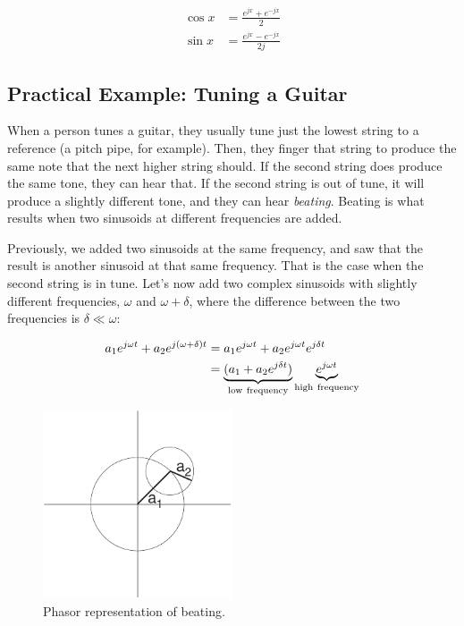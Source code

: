 \begin{align}
\cos x &= \frac{e^{jx}+e^{-jx}}{2}\\ 
\sin x &= \frac{e^{jx}-e^{-jx}}{2j}
\end{align}


\subsection*{Practical Example: Tuning a Guitar}

When a person tunes a guitar, they usually tune just the lowest string
to a reference (a pitch pipe, for example). Then, they finger that
string to produce the same note that the next higher string should.
If the second string does produce the same tone, they can hear that.
If the second string is out of tune, it will produce a slightly
different tone, and they can hear \emph{beating}. Beating is what
results when two sinusoids at different frequencies are added.

Previously, we added two sinusoids at the same frequency, and saw that
the result is another sinusoid at that same frequency.  That is the
case when the second string is in tune. Let's now add two complex
sinusoids with slightly different frequencies, $\omega$ and $\omega +
\delta$, where the difference between the two frequencies is
$\delta\ll\omega$:

\begin{align}
a_1 e^{j\omega t} + a_2 e^{j(\omega+\delta)t} &=
   a_1 e^{j\omega t} + a_2 e^{j\omega t} e^{j\delta t} \notag \\
 & = \underbrace{(a_1 + a_2 e^{j\delta t})}_\mathrm{low~frequency} 
        \underbrace{e^{j\omega t}}_\mathrm{high~frequency} 
\end{align}
  
\begin{figure} 
\centerline{\includegraphics[width=0.5\textwidth]{ch-physical/beating}}
\caption{Phasor representation of beating.\label{fg:beating}} 
\end{figure} 

